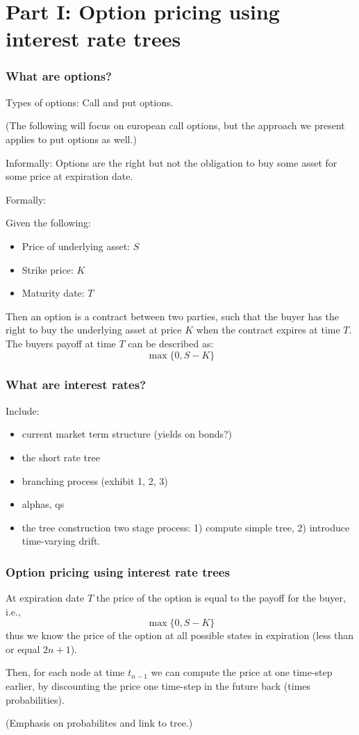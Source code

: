 \section{Part I: Option pricing using interest rate trees}

\begin{frame}
  \frametitle{What are options?}

Types of options: Call and put options.

(The following will focus on european call options, but the
approach we present applies to put options as well.)

Informally: Options are the right but not the obligation to
buy some asset for some price at expiration date.

Formally:

Given the following:
%
\begin{itemize}
  \item Price of underlying asset: $S$
  \item Strike price: $K$
  \item Maturity date: $T$
\end{itemize}
%
Then an option is a contract between two parties, such that
the buyer has the right to buy the underlying asset at price
$K$ when the contract expires at time $T$. The buyers payoff
at time $T$ can be described as:
%
\begin{equation}
  \operatorname{max} \{ 0, S - K \}
\end{equation}
%
\end{frame}

\begin{frame}
  \frametitle{What are interest rates?}
Include:
%
\begin{itemize}
  \item current market term structure (yields on bonds?)
  \item the short rate tree
  \item branching process (exhibit 1, 2, 3)
  \item alphas, qs
  \item the tree construction two stage process: 1) compute
    simple tree, 2) introduce time-varying drift.
\end{itemize}
%
\end{frame}

\begin{frame}
  \frametitle{Option pricing using interest rate trees}

  At expiration date $T$ the price of the option is equal to
  the payoff for the buyer, i.e.,
  \begin{equation}
    \operatorname{max} \{ 0, S - K \}
  \end{equation}
  thus we know the price of the option at all possible
  states in expiration (less than or equal $2n + 1$).

  Then, for each node at time $t_{n-1}$ we can compute the
  price at one time-step earlier, by discounting the price
  one time-step in the future back (times probabilities).

  (Emphasis on probabilites and link to tree.)

\end{frame}
